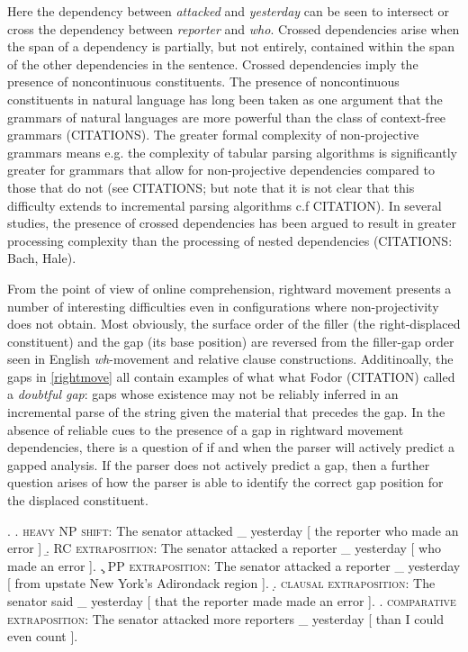 \documentclass[12pt]{article}
\begin{document}
	 Here the dependency between \textit{attacked} and \textit{yesterday} can be seen to intersect or cross the dependency between \textit{reporter} and \textit{who}. Crossed dependencies arise when the span of a dependency is partially, but not entirely, contained within the span of the other dependencies in the sentence.  Crossed dependencies imply the presence of noncontinuous constituents. The presence of noncontinuous constituents in natural language has long been taken as one argument that the grammars of natural languages are more powerful than the class of context-free grammars (CITATIONS). The greater formal complexity of non-projective grammars means   e.g. the complexity of tabular parsing algorithms is significantly greater for grammars that allow for non-projective dependencies compared to those that do not (see CITATIONS; but note that it is not clear that this difficulty extends to incremental parsing algorithms c.f CITATION). In several studies, the presence of crossed dependencies has been argued to result in greater processing complexity than the processing of nested dependencies (CITATIONS: Bach, Hale).
	 
	From the point of view of online comprehension, rightward movement presents a number of interesting difficulties even in configurations where non-projectivity does not obtain. Most obviously, the surface order of the filler (the right-displaced constituent) and the gap (its base position) are reversed from the filler-gap order seen in English \textit{wh}-movement and relative clause constructions. Additinoally, the gaps in \ref{rightmove} all contain examples of what what Fodor (CITATION) called a \textit{doubtful gap}: gaps whose existence may not be reliably inferred in an incremental parse of the string given the material that precedes the gap. In the absence of reliable cues to the presence of a gap in rightward movement dependencies, there is a question of if and when the parser will actively predict a gapped analysis. If the parser does not actively predict a gap, then a further question arises  of how the parser is able to identify the correct gap position for the displaced constituent.
	
	\ex.	\label{rightmove}
		\a.	\label{hnps} \textsc{heavy NP shift}: The senator attacked \_ yesterday [ the reporter who made an error ]
		\b.	\label{rcex} \textsc{RC extraposition}: The senator attacked a reporter \_  yesterday [ who made an error ]. 
		\c.	\label{ppex} \textsc{PP extraposition}: The senator attacked a reporter \_  yesterday [ from upstate New York's Adirondack region ]. 
		\d.	\label{compex} \textsc{clausal extraposition}: The senator said  \_ yesterday [ that the reporter made made an error ]. 
		\e.	\label{comparex} \textsc{comparative extraposition}: The senator attacked more reporters  \_ yesterday [ than I could even count ]. 
\end{document}
